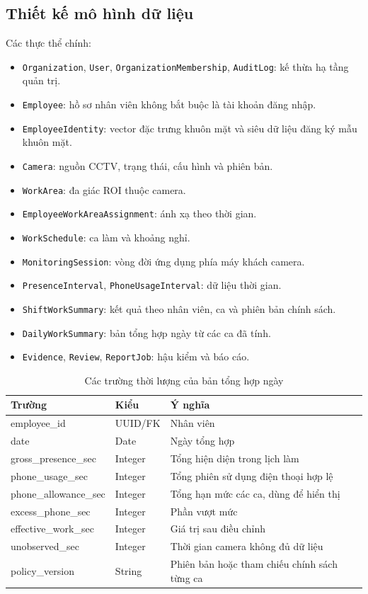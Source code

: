 \subsection{Thiết kế mô hình dữ liệu}
Các thực thể chính:
\begin{itemize}
\item \texttt{Organization}, \texttt{User}, \texttt{OrganizationMembership}, \texttt{AuditLog}: kế thừa hạ tầng quản trị.
\item \texttt{Employee}: hồ sơ nhân viên không bắt buộc là tài khoản đăng nhập.
\item \texttt{EmployeeIdentity}: vector đặc trưng khuôn mặt và siêu dữ liệu đăng ký mẫu khuôn mặt.
\item \texttt{Camera}: nguồn CCTV, trạng thái, cấu hình và phiên bản.
\item \texttt{WorkArea}: đa giác ROI thuộc camera.
\item \texttt{EmployeeWorkAreaAssignment}: ánh xạ theo thời gian.
\item \texttt{WorkSchedule}: ca làm và khoảng nghỉ.
\item \texttt{MonitoringSession}: vòng đời ứng dụng phía máy khách camera.
\item \texttt{PresenceInterval}, \texttt{PhoneUsageInterval}: dữ liệu thời gian.
\item \texttt{ShiftWorkSummary}: kết quả theo nhân viên, ca và phiên bản chính sách.
\item \texttt{DailyWorkSummary}: bản tổng hợp ngày từ các ca đã tính.
\item \texttt{Evidence}, \texttt{Review}, \texttt{ReportJob}: hậu kiểm và báo cáo.
\end{itemize}

\begin{table}[H]
\centering
\caption{Các trường thời lượng của bản tổng hợp ngày}
\label{tab:summary-fields}
\begin{tabularx}{\textwidth}{p{4.4cm}p{3.3cm}X}
\toprule
\textbf{Trường} & \textbf{Kiểu} & \textbf{Ý nghĩa}\\
\midrule
employee\_id & UUID/FK & Nhân viên\\
date & Date & Ngày tổng hợp\\
gross\_presence\_sec & Integer & Tổng hiện diện trong lịch làm\\
phone\_usage\_sec & Integer & Tổng phiên sử dụng điện thoại hợp lệ\\
phone\_allowance\_sec & Integer & Tổng hạn mức các ca, dùng để hiển thị\\
excess\_phone\_sec & Integer & Phần vượt mức\\
effective\_work\_sec & Integer & Giá trị sau điều chỉnh\\
unobserved\_sec & Integer & Thời gian camera không đủ dữ liệu\\
policy\_version & String & Phiên bản hoặc tham chiếu chính sách từng ca\\
\bottomrule
\end{tabularx}
\end{table}

